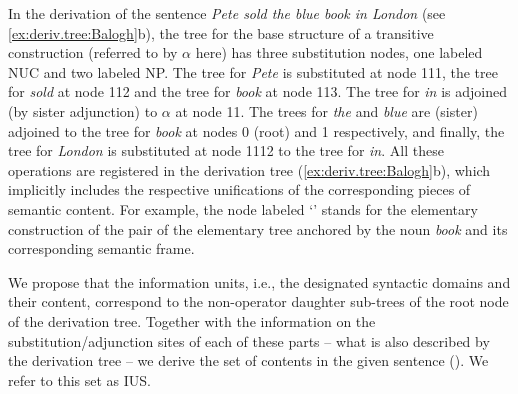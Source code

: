 \documentclass[output=paper,colorlinks,citecolor=brown]{langscibook}
\begin{document}
In the derivation of the sentence \textit{Pete sold the blue book in London} (see \ref{ex:deriv.tree:Balogh}b), the tree for the base structure of a transitive construction (referred to by $\alpha$ here) has three substitution nodes, one labeled NUC and two labeled NP. The tree for \textit{Pete} is substituted at node 111, the tree for \textit{sold} at node 112  and the tree for \textit{book} at node 113. The tree for \textit{in} is adjoined (by sister adjunction) to $\alpha$ at node 11. The trees for \textit{the} and \textit{blue} are (sister) adjoined to the tree for \textit{book} at nodes 0 (root) and 1 respectively, and finally, the tree for \textit{London} is substituted at node 1112 to the tree for \textit{in}. All these operations are registered in the derivation tree (\ref{ex:deriv.tree:Balogh}b), which implicitly includes the respective unifications of the corresponding pieces of semantic content. For example, the node labeled `{}' stands for the elementary construction of the pair of the elementary tree anchored by the noun {\emph{book}} and its corresponding semantic frame. 
 
We propose that the information units, i.e., the designated syntactic domains and their content, correspond to the non-operator daughter sub-trees of the root node of the derivation tree. Together with the information on the substitution/adjunction sites of each of these parts -- what is also described by the derivation tree -- we derive the set of  contents in the given sentence (). We refer to this set as IUS.
\end{document}

